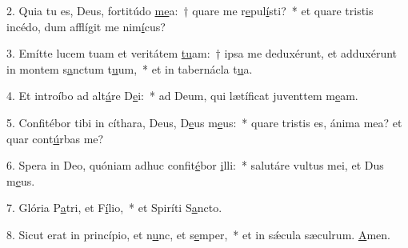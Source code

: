 2. Quia tu es, Deus, fortitúdo \uline{me}a:~† quare me r\uline{e}pul\uline{í}sti?~* et quare tristis incédo, dum afflígit me nim\uline{í}cus?\par 
3. Emítte lucem tuam et veritátem \uline{tu}am:~† ipsa me deduxérunt, et adduxérunt in montem s\uline{a}nctum t\uline{u}um,~* et in tabernácla t\uline{u}a.\par 
4. Et introíbo ad alt\uline{á}re D\uline{e}i:~* ad Deum, qui lætíficat juventtem m\uline{e}am.\par 
5. Confitébor tibi in cíthara, Deus, D\uline{e}us m\uline{e}us:~* quare tristis es, ánima mea? et quar cont\uline{ú}rbas me?\par 
6. Spera in Deo, quóniam adhuc confit\uline{é}bor \uline{i}lli:~* salutáre vultus mei, et Dus m\uline{e}us.\par 
7. Glória P\uline{a}tri, et F\uline{í}lio,~* et Spiríti S\uline{a}ncto.\par 
8. Sicut erat in princípio, et n\uline{u}nc, et s\uline{e}mper,~* et in sǽcula sæculrum. \uline{A}men.\par 
